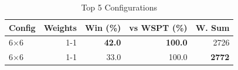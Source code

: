 \begin{table}[htbp]%
\centering%
\begin{tabular}{lrrrr}%
\toprule%
\textbf{Config}&\textbf{Weights}&\textbf{Win (\%)}&\textbf{vs WSPT (\%)}&\textbf{W. Sum}\\%
\midrule%
6×6&1-1&\textbf{42.0}&\textbf{100.0}&2726\\%
6×6&1-1&33.0&100.0&\textbf{2772}\\%
\bottomrule%
\end{tabular}%
\caption{Top 5 Configurations}%
\label{tab:summary}%
\end{table}